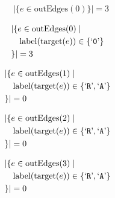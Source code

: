 \begin{align*}
&|\{e \in \mathrm{outEdges}(0) \}| = 3
\end{align*}

\begin{align*}
&|\{e \in \mathrm{outEdges}(0)  \mid \\
&\quad \mathrm{label}(\mathrm{target}(e)) \in \{ \text{`\texttt{0}'} \}\\
&\}| = 3
\end{align*}

\begin{align*}
&|\{e \in \mathrm{outEdges}(1)  \mid \\
&\quad \mathrm{label}(\mathrm{target}(e)) \in \{ \text{`\texttt{R}'},  \text{`\texttt{A}'} \}\\
&\}| = 0
\end{align*}

\begin{align*}
&|\{e \in \mathrm{outEdges}(2)  \mid \\
&\quad \mathrm{label}(\mathrm{target}(e)) \in \{ \text{`\texttt{R}'},  \text{`\texttt{A}'} \}\\
&\}| = 0
\end{align*}

\begin{align*}
&|\{e \in \mathrm{outEdges}(3)  \mid \\
&\quad \mathrm{label}(\mathrm{target}(e)) \in \{ \text{`\texttt{R}'},  \text{`\texttt{A}'} \}\\
&\}| = 0
\end{align*}

